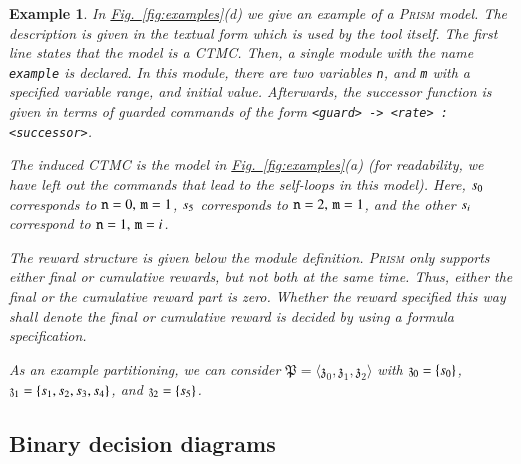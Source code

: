 \documentclass[10pt,twocolumn]{article}
\newtheorem{example}{Example}
\newcommand{\PRISM}{\textsc{Prism}\xspace}
\newcommand{\state}  {{\ensuremath s}}
\newcommand{\apart}{\mathfrak{P}}
\newcommand{\astate}{\mathfrak{z}}
\newcommand{\reffig}[1]{\texorpdfstring{\hyperref[fig:#1]{Fig.~\ref*{fig:#1}}}{Fig.~\ref*{fig:#1}}}
\begin{document}
\begin{example}
  \label{exa:prism}
In \reffig{examples}(d) we give an example of a \PRISM model.
  The description is given in the textual form which is used by the tool itself.
  The first line states that the model is a CTMC.
  Then, a single module with the name \texttt{example} is declared.
  In this module, there are two variables \texttt{n}, and \texttt{m} with a specified variable range, and initial value.
  Afterwards, the successor function is given in terms of guarded commands of the form \texttt{<guard> -> <rate> : <successor>}.

  The induced CTMC is the model in \reffig{examples}(a) (for readability, we have left out the commands that lead to the self-loops in this model).
  Here, $\state_0$ corresponds to $\mbox{\texttt{n}}=0,\,\mbox{\texttt{m}}=1$, $\state_5$ corresponds to 
  $\mbox{\texttt{n}}=2,\,\mbox{\texttt{m}}=1$, and the other $\state_i$ correspond to $\mbox{\texttt{n}}=1,\,\mbox{\texttt{m}}=i$.

  The reward structure is given below the module definition.
  \PRISM only supports either final or cumulative rewards, but not both at the same time.
  Thus, either the final or the cumulative reward part is zero.
  Whether the reward specified this way shall denote the final 
  or cumulative reward is decided by using a formula specification.

  As an example partitioning, we can consider $\apart=\langle\astate_0,\astate_1,\astate_2\rangle$ with
  $\astate_0 = \{\state_0\}$, $\astate_1 = \{\state_1, \state_2, \state_3, \state_4\}$, and $\astate_2 = \{\state_5\}$.
\end{example}

\subsection{Binary decision diagrams}
\label{subsec:obdds}
\end{document}
